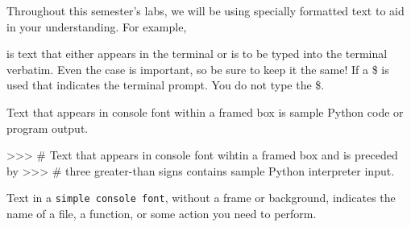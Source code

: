 \documentclass[11pt]{cselabheader}
\begin{document}
Throughout this semester's labs, we will be using specially formatted text to
aid in your understanding. For example,


is text that either appears in the terminal or is to be typed into the terminal
verbatim. Even the case is important, so be sure to keep it the same! If a \$ is
used that indicates the terminal prompt. You do not type the \$.

\begin{python3code}
Text that appears in console font within a framed box is sample Python code
or program output.
\end{python3code}

\begin{pyconcode}
>>> # Text that appears in console font wihtin a framed box and is preceded by
>>> # three greater-than signs contains sample Python interpreter input.
\end{pyconcode}

Text in a \texttt{simple console font}, without a frame or background, indicates
the name of a file, a function, or some action you need to perform.


\end{document}
